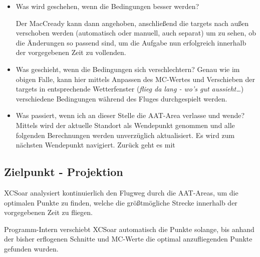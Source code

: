\begin{itemize}
\item Was wird geschehen, wenn die Bedingungen besser werden?

Der MacCready kann dann angehoben, anschließend die targets nach außen verschoben werden (automatisch oder manuell, auch separat) um zu sehen, ob die Änderungen so passend sind, um die Aufgabe nun erfolgreich innerhalb der vorgegebenen Zeit zu vollenden.
\item Was geschieht, wenn die Bedingungen sich verschlechtern? Genau wie im obigen Falle, kann hier mittels Anpassen des MC-Wertes und Verschieben der targets in entsprechende Wetterfenster (\textsl{flieg da lang - wo's gut aussieht\dots}) verschiedene Bedingungen während des Fluges durchgespielt werden.
\item Was passiert, wenn ich an dieser Stelle die AAT-Area verlasse und wende?
Mittels  \blink{}  wird der aktuelle Standort als Wendepunkt genommen und alle folgenden Berechnungen werden  unverzüglich aktualisiert. Es wird zum nächsten Wendepunkt navigiert. Zurück geht es mit \blink{}
\end{itemize}

\subsection*{Zielpunkt - Projektion}
\textsf{XCSoar} analysiert kontinuierlich den Flugweg durch die AAT-Areas, um  die optimalen Punkte zu finden, welche die größtmögliche Strecke innerhalb der vorgegebenen Zeit zu fliegen.

Programm-Intern verschiebt  \textsf{XCSoar} automatisch die Punkte solange, bis anhand der bisher erflogenen Schnitte und MC-Werte die optimal anzufliegenden Punkte gefunden wurden.

